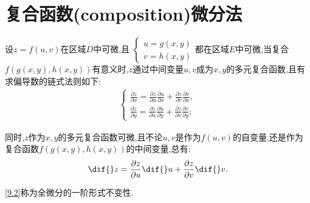 





\section{复合函数(composition)微分法}

\begin{theorem}
    设$z=f(u,v)$在区域$D$中可微,且
    $\begin{cases}
        u=g(x,y)\\
        v=h(x,y)
    \end{cases}$都在区域$E$中可微,当复合$f(g(x,y),h(x,y))$有意义时,$z$通过中间变量$u,v$成为$x,y$的多元复合函数,且有求偏导数的链式法则如下:
    \begin{align}
        \begin{cases}
            \frac{\partial z}{\partial x}=\frac{\partial z}{\partial u}\frac{\partial u}{\partial x}+\frac{\partial z}{\partial v}\frac{\partial v}{\partial x},\\
            \frac{\partial z}{\partial y}=\frac{\partial z}{\partial u}\frac{\partial u}{\partial y}+\frac{\partial z}{\partial v}\frac{\partial v}{\partial y};\label{9.1}
        \end{cases}
    \end{align}

    同时,$z$作为$x,y$的多元复合函数可微,且不论$u,v$是作为$f(u,v)$的自变量,还是作为复合函数$f(g(x,y),h(x,y))$的中间变量,总有:
    \begin{align}
        \dif{}z=\frac{\partial z}{\partial u}\dif{}u+\frac{\partial z}{\partial v}\dif{}v.\label{9.2}
    \end{align}

    \ref{9.2}称为全微分的一阶形式不变性.
\end{theorem}

